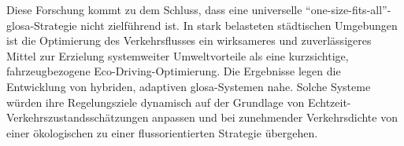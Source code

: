 \mynewline
Diese Forschung kommt zu dem Schluss, dass eine universelle \enquote{one-size-fits-all}-\ac{glosa}-Strategie nicht zielführend ist. In stark belasteten städtischen Umgebungen ist die Optimierung des Verkehrsflusses ein wirksameres und zuverlässigeres Mittel zur Erzielung systemweiter Umweltvorteile als eine kurzsichtige, fahrzeugbezogene Eco-Driving-Optimierung. Die Ergebnisse legen die Entwicklung von hybriden, adaptiven \ac{glosa}-Systemen nahe. Solche Systeme würden ihre Regelungsziele dynamisch auf der Grundlage von Echtzeit-Verkehrszustandsschätzungen anpassen und bei zunehmender Verkehrsdichte von einer ökologischen zu einer flussorientierten Strategie übergehen.